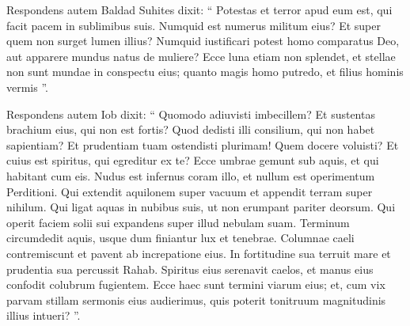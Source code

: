 \begin{biblechapter}
\begin{biblechapter}
\begin{biblechapter}
\begin{biblechapter}
\begin{biblechapter}
\begin{biblechapter}
\begin{biblechapter}
\begin{biblechapter}
\begin{biblechapter}
\begin{biblechapter}
\begin{biblechapter}
\begin{biblechapter}
\begin{biblechapter}
\begin{biblechapter}
\begin{biblechapter}
\begin{biblechapter}
\begin{biblechapter}
\begin{biblechapter}
\begin{biblechapter}
\begin{biblechapter}
\begin{biblechapter}
\begin{biblechapter}
\begin{biblechapter}
\begin{biblechapter}
\begin{biblechapter}
\verse Respondens autem Baldad Suhites dixit:
 \verse “ Potestas et terror apud eum est,
 qui facit pacem in sublimibus suis.
 \verse Numquid est numerus militum eius?
 Et super quem non surget lumen illius?
 \verse Numquid iustificari potest homo comparatus Deo,
 aut apparere mundus natus de muliere?
 \verse Ecce luna etiam non splendet,
 et stellae non sunt mundae in conspectu eius;
 \verse quanto magis homo putredo,
 et filius hominis vermis ”.
 
\begin{biblechapter}
\verse Respondens autem Iob dixit:
 \verse “ Quomodo adiuvisti imbecillem?
 Et sustentas brachium eius, qui non est fortis?
 \verse Quod dedisti illi consilium, qui non habet sapientiam?
 Et prudentiam tuam ostendisti plurimam!
 \verse Quem docere voluisti?
 Et cuius est spiritus, qui egreditur ex te?
 \verse Ecce umbrae gemunt sub aquis,
 et qui habitant cum eis.
 \verse Nudus est infernus coram illo,
 et nullum est operimentum Perditioni.
 \verse Qui extendit aquilonem super vacuum
 et appendit terram super nihilum.
 \verse Qui ligat aquas in nubibus suis,
 ut non erumpant pariter deorsum.
 \verse Qui operit faciem solii sui
 expandens super illud nebulam suam.
 \verse Terminum circumdedit aquis,
 usque dum finiantur lux et tenebrae.
 \verse Columnae caeli contremiscunt
 et pavent ab increpatione eius.
 \verse In fortitudine sua terruit mare
 et prudentia sua percussit Rahab.
 \verse Spiritus eius serenavit caelos,
 et manus eius confodit colubrum fugientem.
 \verse Ecce haec sunt termini viarum eius;
 et, cum vix parvam stillam sermonis eius audierimus,
 quis poterit tonitruum magnitudinis illius intueri? ”.
 

\end{biblechapter}
\end{biblechapter}
\end{biblechapter}
\end{biblechapter}
\end{biblechapter}
\end{biblechapter}
\end{biblechapter}
\end{biblechapter}
\end{biblechapter}
\end{biblechapter}
\end{biblechapter}
\end{biblechapter}
\end{biblechapter}
\end{biblechapter}
\end{biblechapter}
\end{biblechapter}
\end{biblechapter}
\end{biblechapter}
\end{biblechapter}
\end{biblechapter}
\end{biblechapter}
\end{biblechapter}
\end{biblechapter}
\end{biblechapter}
\end{biblechapter}
\end{biblechapter}
